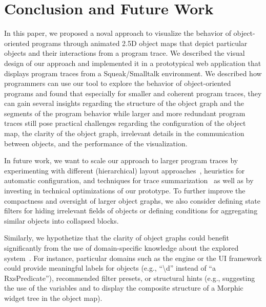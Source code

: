 \section{Conclusion and Future Work}
\label{sec:conclusion}

In this paper, we proposed a noval approach to visualize the behavior of object-oriented programs through animated 2.5D object maps that depict particular objects and their interactions from a program trace.
We described the visual design of our approach and implemented it in a prototypical web application that displays program traces from a Squeak/Smalltalk environment.
We described how programmers can use our tool to explore the behavior of object-oriented programs and found that especially for smaller and coherent program traces, they can gain several insights regarding the structure of the object graph and the segments of the program behavior while larger and more redundant program traces still pose practical challenges regarding the configuration of the object map, the clarity of the object graph, irrelevant details in the communication between objects, and the performance of the visualization.

In future work, we want to scale our approach to larger program traces by experimenting with different (hierarchical) layout approaches~\cite{kuhn2008consistent,atzberger2023visualization}, heuristics for automatic configuration, and techniques for trace summarization~\cite{hamouLhadj2006summarizing,noda2017identifying} as well as by investing in technical optimizations of our prototype.
To further improve the compactness and oversight of larger object graphs, we also consider defining state filters for hiding irrelevant fields of objects or defining conditions for aggregating similar objects into collapsed blocks.

Similarly, we hypothetize that the clarity of object graphs could benefit significantly from the use of domain-specific knowledge about the explored system~\cite{chis2014moldable}.
For instance, particular domains such as the  engine or the  UI framework could provide meaningful labels for objects (e.g., ``\textbackslash{}d'' instead of ``a RxsPredicate''), recommended filter presets, or structural hints (e.g., suggesting the use of the variables  and  to display the composite structure of a Morphic widget tree in the object map).


